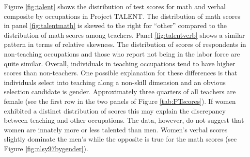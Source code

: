 \documentclass[onehalfspacing,11pt]{article}
\begin{document}
Figure \ref{fig:talent} shows the distribution of test scores for math and verbal composite by occupations in Project TALENT. The distribution of math scores in panel \ref{fig:talentmath} is skewed to the right for ``other'' compared to the distribution of math scores among teachers. Panel \ref{fig:talentverb} shows a similar pattern in terms of relative skewness. The distribution of scores of respondents in non-teaching occupations and those who report not being in the labor force are quite similar. Overall, individuals in teaching occupations tend to have higher scores than non-teachers. One possible explanation for these differences is that individuals select into teaching along a non-skill dimension and an obvious selection candidate is gender. Approximately three quarters of all teachers are female (see the first row in the two panels of Figure \ref{tab:PTscores}). If women exhibited a distinct distribution of scores this may explain the discrepancy between teaching and other occupations. The data, however, do not suggest that women are innately more or less talented than men. Women's verbal scores slightly dominate the men's while the opposite is true for the math scores (see Figure \ref{fig:nlsy97bygender}).
\end{document}

